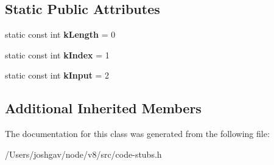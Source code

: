 \subsection*{Static Public Attributes}
\begin{DoxyCompactItemize}
\item 
static const int {\bfseries k\+Length} = 0\hypertarget{classv8_1_1internal_1_1_reg_exp_construct_result_stub_a1be6a2ca91f7bac74b71a7a585301b5b}{}\label{classv8_1_1internal_1_1_reg_exp_construct_result_stub_a1be6a2ca91f7bac74b71a7a585301b5b}

\item 
static const int {\bfseries k\+Index} = 1\hypertarget{classv8_1_1internal_1_1_reg_exp_construct_result_stub_a5dfc941d298e18dde92dde23b7acac51}{}\label{classv8_1_1internal_1_1_reg_exp_construct_result_stub_a5dfc941d298e18dde92dde23b7acac51}

\item 
static const int {\bfseries k\+Input} = 2\hypertarget{classv8_1_1internal_1_1_reg_exp_construct_result_stub_ada768005548af34163d1441b1687d4b3}{}\label{classv8_1_1internal_1_1_reg_exp_construct_result_stub_ada768005548af34163d1441b1687d4b3}

\end{DoxyCompactItemize}
\subsection*{Additional Inherited Members}


The documentation for this class was generated from the following file\+:\begin{DoxyCompactItemize}
\item 
/\+Users/joshgav/node/v8/src/code-\/stubs.\+h\end{DoxyCompactItemize}
